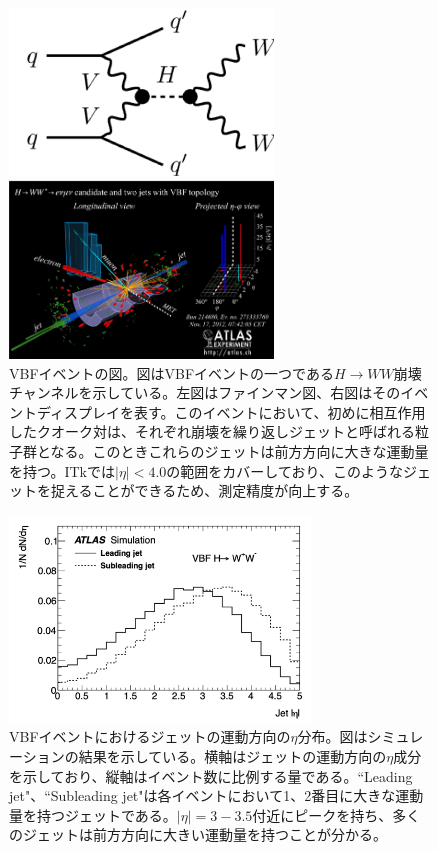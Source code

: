 \begin{figure}[bpt]
  \begin{minipage}{0.5\hsize}
    \begin{center}
    \includegraphics[width=70mm]{./VBF_fainman.png}
    \end{center}
  \end{minipage}
  \begin{minipage}{0.5\hsize}
    \begin{center}
    \includegraphics[width=70mm]{./VBF_event_display.png}
    \end{center}
  \end{minipage}
  \caption[VBFイベントの図]{VBFイベントの図\cite{1-8}。図はVBFイベントの一つである$H\rightarrow WW$崩壊チャンネルを示している。左図はファインマン図、右図はそのイベントディスプレイを表す。このイベントにおいて、初めに相互作用したクオーク対は、それぞれ崩壊を繰り返しジェットと呼ばれる粒子群となる。このときこれらのジェットは前方方向に大きな運動量を持つ。ITkでは$|\eta|<4.0$の範囲をカバーしており、このようなジェットを捉えることができるため、測定精度が向上する。}
  \label{VBF_image}
\end{figure}

\begin{figure}[bpt]\centering
\includegraphics[width=8cm]{./VBF_jet_eta.png}
\caption[VBFイベントにおけるジェットの運動方向の$\eta$分布]{VBFイベントにおけるジェットの運動方向の$\eta$分布\cite{1-3}。図はシミュレーションの結果を示している。横軸はジェットの運動方向の$\eta$成分を示しており、縦軸はイベント数に比例する量である。``Leading jet"、``Subleading jet"は各イベントにおいて1、2番目に大きな運動量を持つジェットである。$|\eta|=3-3.5$付近にピークを持ち、多くのジェットは前方方向に大きい運動量を持つことが分かる。}
\label{VBF_jet_eta}
\end{figure}

